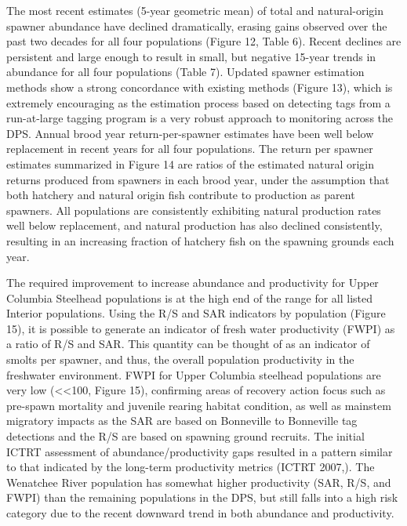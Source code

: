 \documentclass[
  letterpaper,
  oneside,
  open=any]{scrbook}
\begin{document}
The most recent estimates (5-year geometric mean) of total and
natural-origin spawner abundance have declined dramatically, erasing
gains observed over the past two decades for all four populations
(Figure 12, Table 6). Recent declines are persistent and large enough to
result in small, but negative 15-year trends in abundance for all four
populations (Table 7). Updated spawner estimation methods show a strong
concordance with existing methods (Figure 13), which is extremely
encouraging as the estimation process based on detecting tags from a
run-at-large tagging program is a very robust approach to monitoring
across the DPS. Annual brood year return-per-spawner estimates have been
well below replacement in recent years for all four populations. The
return per spawner estimates summarized in Figure 14 are ratios of the
estimated natural origin returns produced from spawners in each brood
year, under the assumption that both hatchery and natural origin fish
contribute to production as parent spawners. All populations are
consistently exhibiting natural production rates well below replacement,
and natural production has also declined consistently, resulting in an
increasing fraction of hatchery fish on the spawning grounds each year.

The required improvement to increase abundance and productivity for
Upper Columbia Steelhead populations is at the high end of the range for
all listed Interior populations. Using the R/S and SAR indicators by
population (Figure 15), it is possible to generate an indicator of fresh
water productivity (FWPI) as a ratio of R/S and SAR. This quantity can
be thought of as an indicator of smolts per spawner, and thus, the
overall population productivity in the freshwater environment. FWPI for
Upper Columbia steelhead populations are very low
(\textless\textless100, Figure 15), confirming areas of recovery action
focus such as pre-spawn mortality and juvenile rearing habitat
condition, as well as mainstem migratory impacts as the SAR are based on
Bonneville to Bonneville tag detections and the R/S are based on
spawning ground recruits. The initial ICTRT assessment of
abundance/productivity gaps resulted in a pattern similar to that
indicated by the long-term productivity metrics (ICTRT 2007,). The
Wenatchee River population has somewhat higher productivity (SAR, R/S,
and FWPI) than the remaining populations in the DPS, but still falls
into a high risk category due to the recent downward trend in both
abundance and productivity.
\end{document}
